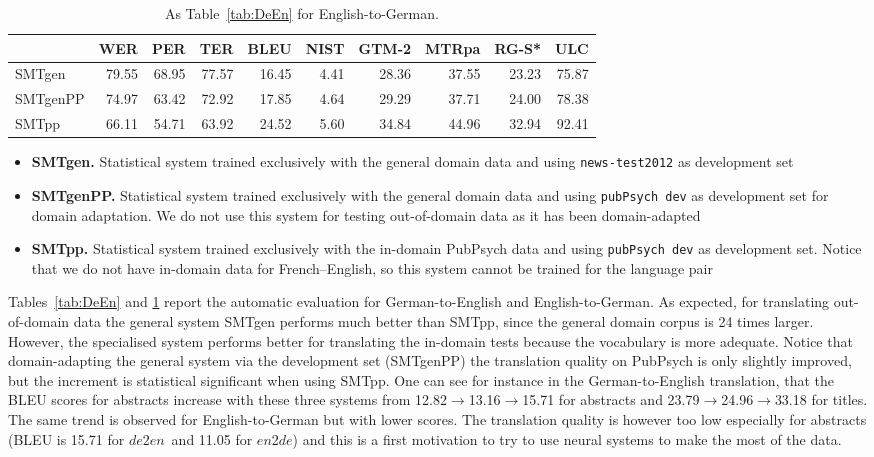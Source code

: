 \documentclass[a4paper,11pt]{article}
\newcommand{\en}{$en$}
\newcommand{\de}{$de$}
\begin{document}
\begin{table}[t]
\begin{tabular}{lrrrrrrrrr}
\toprule
         & WER   &  PER  & TER   &  BLEU & NIST & GTM-2 & MTRpa & RG-S* & ULC \\
\midrule
SMTgen	 & 79.55 & 68.95 & 77.57 & 16.45 & 4.41 & 28.36 & 37.55 & 23.23 & 75.87 \\  
SMTgenPP & 74.97 & 63.42 & 72.92 & 17.85 & 4.64 & 29.29 & 37.71 & 24.00 & 78.38 \\  
SMTpp	 & 66.11 & 54.71 & 63.92 & 24.52 & 5.60 & 34.84 & 44.96 & 32.94 & 92.41 \\  
\bottomrule
\end{tabular}
 \caption{As Table~\ref{tab:DeEn} for English-to-German.}
 \label{tab:EnDe}
\end{table}




\begin{itemize}
 \item {\bf SMTgen.} Statistical system trained exclusively with the general domain data and using {\tt news-test2012} as development set
 \item {\bf SMTgenPP.} Statistical system trained exclusively with the general domain data and using {\tt pubPsych dev} as development set for domain adaptation. We do not use this system for testing out-of-domain data as it has been domain-adapted
 \item {\bf SMTpp.} Statistical system trained exclusively with the in-domain PubPsych data and using {\tt pubPsych dev} as development set. Notice that we do not have in-domain data for French--English, so this system cannot be trained for the language pair
\end{itemize}

Tables~\ref{tab:DeEn} and \ref{tab:EnDe} report the automatic evaluation for German-to-English and English-to-German. As expected, for translating out-of-domain data the general system SMTgen performs much better than SMTpp, since the general domain corpus is 24 times larger. However, the specialised system performs better for translating the in-domain tests because the vocabulary is more adequate. Notice that domain-adapting the general system via the development set (SMTgenPP) the translation quality on PubPsych is only slightly improved, but the increment is statistical significant when using SMTpp. One can see for instance in the  German-to-English translation, that the BLEU scores for abstracts increase with these three systems from  12.82$\rightarrow$13.16$\rightarrow$15.71 for abstracts and 
23.79$\rightarrow$24.96$\rightarrow$33.18 for titles. The same trend is observed for English-to-German but with lower scores. The translation quality is however too low especially for abstracts (BLEU is 15.71 for \de2\en\ and 11.05 for \en2\de) and this is a first motivation to try to use neural systems to make the most of the data.
 
\end{document}
